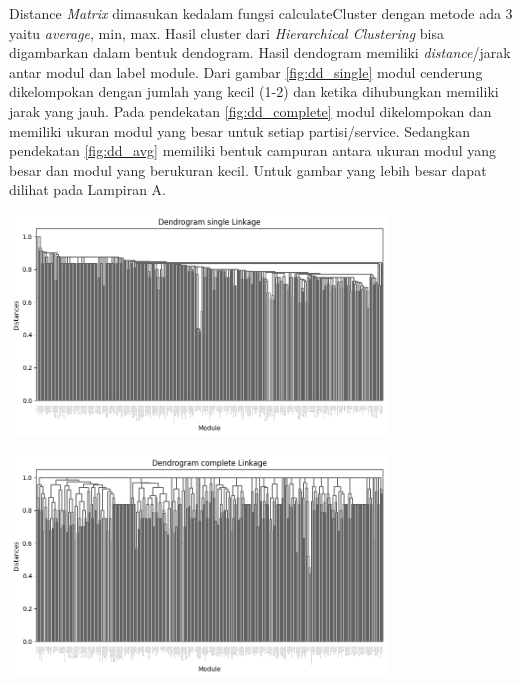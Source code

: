 Distance \textit{Matrix} dimasukan kedalam fungsi calculateCluster dengan metode ada 3 yaitu \textit{average}, min, max. Hasil cluster dari \textit{Hierarchical Clustering} bisa digambarkan dalam bentuk dendogram. Hasil dendogram memiliki \textit{distance}/jarak antar modul dan label module. Dari gambar \ref{fig:dd_single} modul cenderung dikelompokan dengan jumlah yang kecil (1-2) dan ketika dihubungkan memiliki jarak yang jauh. Pada pendekatan \ref{fig:dd_complete} modul dikelompokan dan memiliki ukuran modul yang besar untuk setiap partisi/service. Sedangkan pendekatan \ref{fig:dd_avg} memiliki bentuk campuran antara ukuran modul yang besar dan modul yang berukuran kecil. Untuk gambar yang lebih besar dapat dilihat pada Lampiran A.


\begin{center}
	\includegraphics[width=10cm]{img/bab_4/single_dd.png}
	\label{fig:dd_single}
\end{center}

\begin{center}
	\includegraphics[width=10cm]{img/bab_4/complete_dd.png}
	\label{fig:dd_complete}
\end{center}

